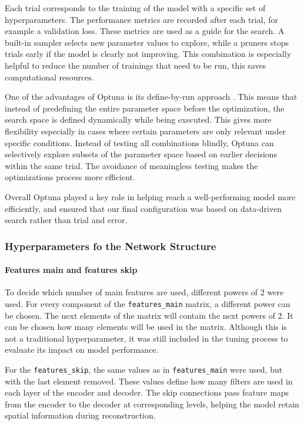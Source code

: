 \documentclass[twocolumn]{article}
\begin{document}
Each trial corresponds to the training of the model with a specific set of hyperparameters. 
The performance metrics are recorded after each trial, for example a validation loss. These metrics are used as a guide for the search. 
A built-in sampler selects new parameter values to explore, while a pruners stops trials early if the model is clearly not improving. 
This combination is especially helpful to reduce the number of trainings that need to be run, this saves computational resources. 

One of the advantages of Optuna is its define-by-run approach \cite{10.1145/3292500.3330701}. 
This means that instead of predefining the entire parameter space before the optimization, the search space is defined dynamically while being executed. 
This gives more flexibility especially in cases where certain parameters are only relevant under specific conditions. 
Instead of testing all combinations blindly, Optuna can selectively explore subsets of the parameter space based on earlier decisions within the same trial. 
The avoidance of meaningless testing makes the optimizations process  more efficient. 

Overall Optuna played a key role in helping reach a well-performing model more efficiently, and ensured that our final configuration was based on data-driven search rather than trial and error.

\subsubsection{Hyperparameters fo the Network Structure }
\paragraph{Features main and features skip}
To decide which number of main features are used, different powers of $2$ were used.  
For every component of the \texttt{features\_main} matrix, a different power can be chosen.  
The next elements of the matrix will contain the next powers of $2$. It can be chosen how many elements will be used in the matrix.  
Although this is not a traditional hyperparameter, it was still included in the tuning process to evaluate its impact on model performance.

For the \texttt{features\_skip}, the same values as in \texttt{features\_main} were used, but with the last element removed.  
These values define how many filters are used in each layer of the encoder and decoder.  
The skip connections pass feature maps from the encoder to the decoder at corresponding levels, helping the model retain spatial information during reconstruction.
\end{document}
